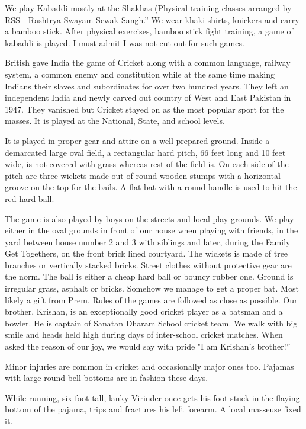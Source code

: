 We play Kabaddi mostly at the Shakhas (Physical training classes arranged
by RSS—Rashtrya Swayam Sewak Sangh.” We wear khaki shirts, knickers and
carry a bamboo stick. After physical exercises, bamboo stick fight
training, a game of kabaddi is played. I must admit I was not cut out for
such games. 

British gave India the game of Cricket along with a common language,
railway system, a common enemy and constitution while at the same time
making Indians their slaves and subordinates for over two hundred years.
They left an independent India and newly carved out country of West and
East Pakistan in 1947. They vanished but Cricket stayed on as the most
popular sport for the masses. It is played at the National, State, and
school levels. 

It is played in proper gear and attire on a well prepared ground. Inside
a demarcated large oval field, a rectangular hard pitch, 66 feet long and
10 feet wide, is not covered with grass whereas rest of the field is. On
each side of the pitch are three wickets made out of round wooden stumps
with a horizontal groove on the top for the bails. A flat bat with a round
handle is used to hit the red hard ball. 

The game is also played by boys on the streets and local play grounds. We
play either in the oval grounds in front of our house when playing with
friends, in the yard between house number 2 and 3 with siblings and later,
during the Family Get Togethers, on the front brick lined courtyard. The
wickets is made of tree branches or vertically stacked bricks. Street
clothes without protective gear are the norm. The ball is either a cheap
hard ball or bouncy rubber one. Ground is irregular grass, asphalt or
bricks. Somehow we manage to get a proper bat. Most likely a gift from
Prem. Rules of the games are followed as close as possible. Our brother,
Krishan, is an exceptionally good cricket player as a batsman and
a bowler. He is captain of Sanatan Dharam School cricket team. We walk
with big smile and heads held  high during days of inter-school cricket
matches. When asked the reason of our joy, we would say with pride "I am
Krishan's brother!”

Minor injuries are common in cricket and occasionally major ones too.
Pajamas with large round bell bottoms are in fashion these days. 

While running, six foot tall, lanky Virinder once gets his foot stuck in
the flaying bottom of the pajama, trips and fractures his  left forearm.
A local masseuse fixed it. 


